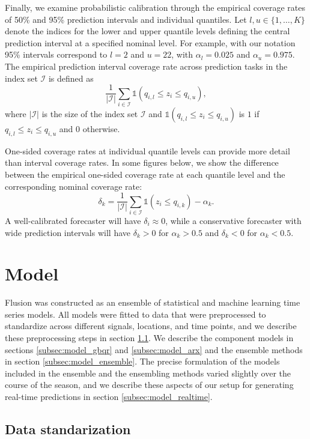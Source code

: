 \documentclass{article}\usepackage[]{graphicx}\usepackage[]{xcolor}
\providecommand{\DIFaddend}{} %
\DeclareRobustCommand{\DIFaddend}{\DIFOaddend \let\includegraphics\DIFOincludegraphics} %
\begin{document}
\DIFaddend Finally, we examine probabilistic calibration through the empirical coverage rates of 50\% and 95\% prediction intervals and individual quantiles. Let $l, u \in \{1, \ldots, K\}$ denote the indices for the lower and upper quantile levels defining the central prediction interval at a specified nominal level. For example, with our notation 95\% intervals correspond to $l = 2$ and $u = 22$, with $\alpha_l = 0.025$ and $\alpha_u = 0.975$. The empirical prediction interval coverage rate across prediction tasks in the index set $\mathcal{I}$ is defined as
$$\frac{1}{\vert \mathcal{I} \vert} \sum_{i \in \mathcal{I}} \mathds{1}(q_{i,l} \leq z_i \leq q_{i,u}),$$
where $\vert \mathcal{I} \vert$ is the size of the index set $\mathcal{I}$ and $\mathds{1}(q_{i,l} \leq z_i \leq q_{i,u})$ is $1$ if $q_{i,l} \leq z_i \leq q_{i,u}$ and $0$ otherwise.

One-sided coverage rates at individual quantile levels can provide more detail than interval coverage rates. In some figures below, we show the difference between the empirical one-sided coverage rate at each quantile level and the corresponding nominal coverage rate:
$$\delta_k = \frac{1}{\vert \mathcal{I} \vert} \sum_{i \in \mathcal{I}} \mathds{1}(z_i \leq q_{i,k}) - \alpha_k.$$
A well-calibrated forecaster will have $\delta_i \approx 0$, while a conservative forecaster with wide prediction intervals will have $\delta_k > 0$ for $\alpha_k > 0.5$ and $\delta_k < 0$ for $\alpha_k < 0.5$.

\section{Model}
\label{sec:model}

Flusion was constructed as an ensemble of statistical and machine learning time series models.  All models were fitted to data that were preprocessed to standardize across different signals, locations, and time points, and we describe these preprocessing steps in section \ref{subsec:data_standardization}.  We describe the component models in sections \ref{subsec:model_gbqr} and \ref{subsec:model_arx} and the ensemble methods in section \ref{subsec:model_ensemble}.  The precise formulation of the models included in the ensemble and the ensembling methods varied slightly over the course of the season, and we describe these aspects of our setup for generating real-time predictions in section \ref{subsec:model_realtime}.

\subsection{Data standarization}
\label{subsec:data_standardization}
\end{document}
